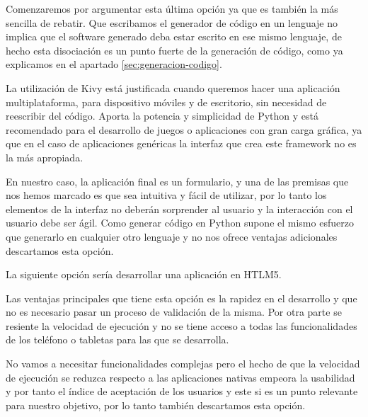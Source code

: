 Comenzaremos por argumentar esta última opción ya que es también la más sencilla de rebatir. Que escribamos el generador de código en un lenguaje no implica que el software generado deba estar escrito en ese mismo lenguaje, de hecho esta disociación es un punto fuerte de la generación de código, como ya explicamos en el apartado \ref{sec:generacion-codigo}.\par 
La utilización de Kivy está justificada cuando queremos hacer una aplicación multiplataforma, para dispositivo móviles y de escritorio, sin necesidad de reescribir del código. Aporta la potencia y simplicidad de Python y está recomendado para el desarrollo de juegos o aplicaciones con gran carga gráfica, ya que en el caso de aplicaciones genéricas la interfaz que crea este framework no es la más apropiada.\par
En nuestro caso, la aplicación final es un formulario,  y una de las premisas que nos hemos marcado es que sea intuitiva y fácil de utilizar, por lo tanto los elementos de la interfaz no deberán sorprender al usuario y la interacción con el usuario debe ser ágil. Como generar código en Python supone el mismo esfuerzo que generarlo en cualquier otro lenguaje y no nos ofrece ventajas adicionales descartamos esta opción.\medskip\par

La siguiente opción sería desarrollar una aplicación en HTLM5.\par
Las ventajas principales que tiene esta opción es la rapidez en el desarrollo y que no es necesario pasar un proceso de validación de la misma. Por otra parte se resiente la velocidad de ejecución y no se tiene acceso a todas las funcionalidades de los teléfono o tabletas para las que se desarrolla.\par 
No vamos a necesitar funcionalidades complejas pero el hecho de que la velocidad de ejecución se reduzca respecto a las aplicaciones nativas empeora la usabilidad y por tanto el índice de aceptación de los usuarios y este si es un punto relevante para nuestro objetivo, por lo tanto también descartamos esta opción.\medskip\par

